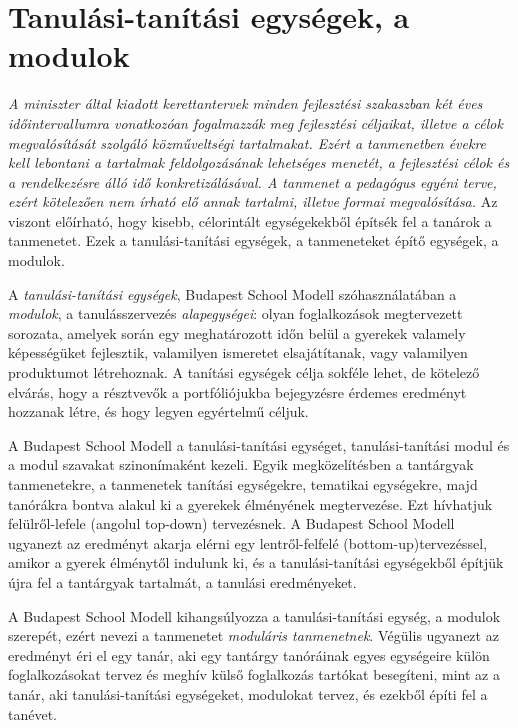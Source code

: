 \section{Tanulási-tanítási egységek, a modulok}
\label{sec:modulok}

\emph{A miniszter által kiadott kerettantervek minden fejlesztési szakaszban két éves időintervallumra vonatkozóan fogalmazzák meg fejlesztési céljaikat, illetve a célok megvalósítását szolgáló közműveltségi tartalmakat. Ezért a tanmenetben évekre kell lebontani a tartalmak feldolgozásának lehetséges menetét, a fejlesztési célok és a rendelkezésre álló idő konkretizálásával. A tanmenet a pedagógus egyéni terve, ezért kötelezően nem írható elő annak tartalmi, illetve formai megvalósítása.}\citep{ofi:tanmenet} Az viszont előírható, hogy kisebb, célorintált egységekekből építsék fel a tanárok a tanmenetet. Ezek a tanulási-tanítási egységek, a tanmeneteket építő egységek, a modulok.

A \emph{tanulási-tanítási egységek}, Budapest School Modell szóhasználatában a \emph{modulok}, a tanulásszervezés \emph{alapegységei}: olyan foglalkozások megtervezett sorozata, amelyek során egy meghatározott időn belül a gyerekek valamely képességüket fejlesztik, valamilyen ismeretet elsajátítanak, vagy valamilyen produktumot létrehoznak. A tanítási egységek célja sokféle lehet, de kötelező elvárás, hogy a résztvevők a portfóliójukba bejegyzésre érdemes eredményt hozzanak létre, és hogy legyen egyértelmű céljuk.


      A Budapest School Modell a tanulási-tanítási egységet, tanulási-tanítási modul és a modul szavakat szinonímaként kezeli. Egyik megközelítésben a tantárgyak tanmenetekre, a tanmenetek tanítási egységekre, tematikai egységekre, majd tanórákra bontva alakul ki a gyerekek élményének megtervezése. Ezt hívhatjuk felülről-lefele (angolul top-down) tervezésnek. A Budapest School Modell ugyanezt az eredményt akarja elérni egy lentről-felfelé (bottom-up)tervezéssel, amikor a gyerek élménytől indulunk ki, és a tanulási-tanítási egységekből építjük újra fel a tantárgyak tartalmát, a tanulási eredményeket.

      A Budapest School Modell kihangsúlyozza a tanulási-tanítási egység, a modulok szerepét, ezért nevezi a tanmenetet \emph{moduláris tanmenetnek}. Végülis ugyanezt az eredményt éri el egy tanár, aki egy tantárgy tanóráinak egyes egységeire külön foglalkozásokat tervez és meghív külső foglalkozás tartókat besegíteni, mint az a tanár, aki tanulási-tanítási egységeket, modulokat tervez, és ezekből építi fel a tanévet.

